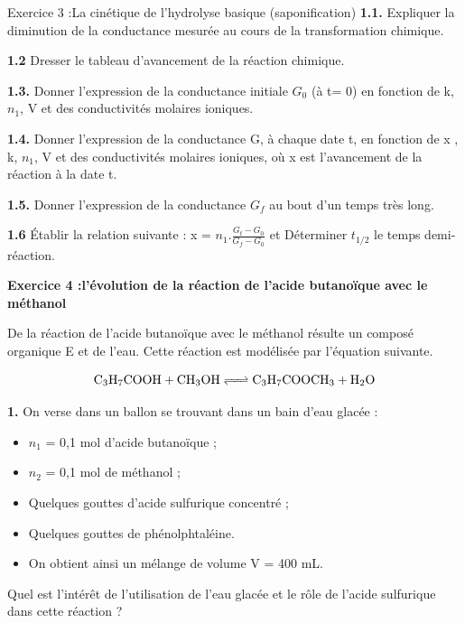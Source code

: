 \documentclass[12pt, french]{article}
\begin{document}
\begin{Box2}{Exercice 3 :La cinétique de l’hydrolyse basique (saponification) }
\textbf{1.1. }Expliquer la diminution de la conductance mesurée au cours de la transformation chimique.

\textbf{1.2} Dresser le tableau d’avancement de la réaction chimique.

\textbf{1.3. }Donner l’expression de la conductance initiale $G_0$ (à t= 0) en fonction de k, $n_1$, V et des conductivités
molaires ioniques.

\textbf{1.4. } Donner l’expression de la conductance G, à chaque date t, en fonction de x , k, $n_1$, V et des
conductivités molaires ioniques, où x est l’avancement de la réaction à la date t.

\textbf{1.5. } Donner l’expression de la conductance $G_f$ au bout d’un temps très long.

\textbf{1.6} Établir la relation suivante : x = $n_1.\frac{G_t - G_0}{G_f - G_0}$ et Déterminer $t_{1/2}$ le temps demi-réaction.


\end{Box2}

\begin{tcolorbox}\textbf{Exercice 4 :l’évolution de la réaction de l’acide butanoïque avec le méthanol }
\end{tcolorbox}
De la réaction de l’acide butanoïque avec le méthanol résulte un composé organique E et de l’eau.
Cette réaction est modélisée par l’équation suivante.

$$\ce{C_3H_7COOH + CH_3OH <=> C_3H_7COOCH_3 + H_2O}$$


\textbf{1. }On verse dans un ballon se trouvant dans un bain d’eau glacée :
\begin{itemize}
	\item $n_1$ = 0,1 mol d’acide butanoïque ;

	\item $n_2$ = 0,1 mol de méthanol ;
	\item Quelques gouttes d’acide sulfurique concentré ;

	\item Quelques gouttes de phénolphtaléine.
	\item On obtient ainsi un mélange de volume V = 400 mL.
\end{itemize}
Quel est l’intérêt de l’utilisation de l’eau glacée et le rôle de l’acide sulfurique dans cette réaction ?
\end{document}
